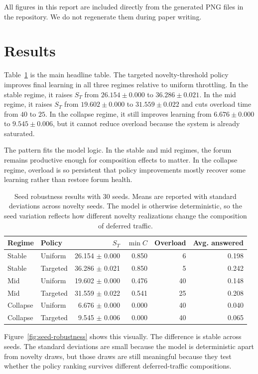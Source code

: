 \documentclass{article}
\begin{document}
All figures in this report are included directly from the generated PNG files in the repository. We do not regenerate them during paper writing.

\section{Results}
Table~\ref{tab:seed-robustness} is the main headline table. The targeted novelty-threshold policy improves final learning in all three regimes relative to uniform throttling. In the stable regime, it raises $S_T$ from $26.154 \pm 0.000$ to $36.286 \pm 0.021$. In the mid regime, it raises $S_T$ from $19.602 \pm 0.000$ to $31.559 \pm 0.022$ and cuts overload time from $40$ to $25$. In the collapse regime, it still improves learning from $6.676 \pm 0.000$ to $9.545 \pm 0.006$, but it cannot reduce overload because the system is already saturated.

The pattern fits the model logic. In the stable and mid regimes, the forum remains productive enough for composition effects to matter. In the collapse regime, overload is so persistent that policy improvements mostly recover some learning rather than restore forum health.

\begin{table}[H]
\centering
\caption{Seed robustness results with 30 seeds. Means are reported with standard deviations across novelty seeds. The model is otherwise deterministic, so the seed variation reflects how different novelty realizations change the composition of deferred traffic.}
\label{tab:seed-robustness}
\begin{tabular}{llrrrr}
\toprule
Regime & Policy & $S_T$ & $\min C$ & Overload & Avg. answered \\
\midrule
Stable & Uniform & 26.154 $\pm$ 0.000 & 0.850 & 6 & 0.198 \\
Stable & Targeted & 36.286 $\pm$ 0.021 & 0.850 & 5 & 0.242 \\
Mid & Uniform & 19.602 $\pm$ 0.000 & 0.476 & 40 & 0.148 \\
Mid & Targeted & 31.559 $\pm$ 0.022 & 0.541 & 25 & 0.208 \\
Collapse & Uniform & 6.676 $\pm$ 0.000 & 0.000 & 40 & 0.040 \\
Collapse & Targeted & 9.545 $\pm$ 0.006 & 0.000 & 40 & 0.065 \\
\bottomrule
\end{tabular}
\end{table}

Figure~\ref{fig:seed-robustness} shows this visually. The difference is stable across seeds. The standard deviations are small because the model is deterministic apart from novelty draws, but those draws are still meaningful because they test whether the policy ranking survives different deferred-traffic compositions.
\end{document}
